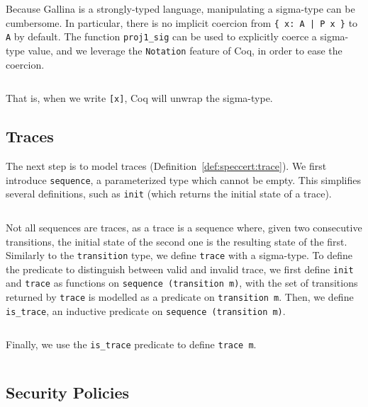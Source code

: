 \inputminted[gobble=2,firstline=29,lastline=32]{coq}{Listings/SpecCert.v}

Because {\sc Gallina} is a strongly-typed language, manipulating a sigma-type
can be cumbersome.
%
In particular, there is no implicit coercion from \texttt{\{ x: A | P x \}} to
\texttt{A} by default.
%
The function \texttt{proj1\_sig} can be used to explicitly coerce a sigma-type
value, and we leverage the \texttt{Notation} feature of Coq, in order to ease
the coercion.

\inputminted[gobble=2,firstline=34,lastline=35]{coq}{Listings/SpecCert.v}

That is, when we write \texttt{[x]}, Coq will unwrap the sigma-type.

\subsection{Traces}

The next step is to model traces (Definition~\ref{def:speccert:trace}).
%
We first introduce \texttt{sequence}, a parameterized type which cannot be
empty.
%
This simplifies several definitions, such as \texttt{init} (which returns the
initial state of a trace).

\inputminted[gobble=2,firstline=39,lastline=46]{coq}{Listings/SpecCert.v}

Not all sequences are traces, as a trace is a sequence where, given two
consecutive transitions, the initial state of the second one is the resulting
state of the first.
%
Similarly to the \texttt{transition} type, we define \texttt{trace} with a
sigma-type.
%
To define the predicate to distinguish between valid and invalid trace, we first
define \texttt{init} and \texttt{trace} as functions on \texttt{sequence
  (transition~m)}, with the set of transitions returned by \texttt{trace} is
modelled as a predicate on \texttt{transition m}.
%
Then, we define \texttt{is\_trace}, an inductive predicate on \texttt{sequence
  (transition~m)}.

\inputminted[gobble=2,firstline=62,lastline=71]{coq}{Listings/SpecCert.v}

Finally, we use the \texttt{is\_trace} predicate to define \texttt{trace m}.

\inputminted[gobble=2,firstline=73,lastline=76]{coq}{Listings/SpecCert.v}

\subsection{Security Policies}

